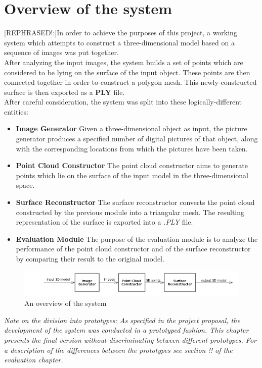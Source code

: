 \documentclass[12pt,a4paper,twoside,openright]{report}
\begin{document}
\section{Overview of the system}
[REPHRASED!:]In order to achieve the purposes of this project, a working system which attempts to construct a three-dimensional model based on a sequence of images was put together. \\
\linebreak
After analyzing the input images, the system builds a set of points which are considered to be lying on the surface of the input object. These points are then connected together in order to construct a polygon mesh. This newly-constructed surface is then exported as a \textbf{PLY} file.\\
\linebreak
After careful consideration, the system was split into these logically-different entities:
\begin{itemize}
\item \textbf{Image Generator}
Given a three-dimensional object as input, the picture generator produces a specified number of digital pictures of that object, along with the corresponding locations from which the pictures have been taken. 
\item \textbf{Point Cloud Constructor}
The point cloud constructor aims to generate points which lie on the surface of the input model in the three-dimensional space. 
\item \textbf{Surface Reconstructor}
The surface reconstructor converts the point cloud constructed by the previous module into a triangular mesh. The resulting representation of the surface is exported into a \textit{.PLY} file.
\item \textbf{Evaluation Module}
The purpose of the evaluation module is to analyze the performance of the point cloud constructor and of the surface reconstructor by comparing their result to the original model. \\
\end{itemize}
\begin{figure}
\centerline{\includegraphics[scale=0.7]{figs/overview.png}}
\caption{An overview of the system}
\end{figure}
\textit{Note on the division into prototypes: As specified in the project proposal, the development of the system was conducted in a prototyped fashion. This chapter presents the final version without discriminating between different prototypes. For a description of the differences between the prototypes see section !! of the evaluation chapter.}
\end{document}
